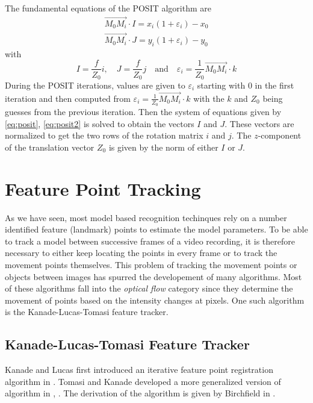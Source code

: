 \documentclass[11pt,a4paper]{report}
\begin{document}
The fundamental equations of the POSIT algorithm are
\begin{gather}\label{eq:posit}
\overrightarrow{M_0M_i}\cdot I  = x_i(1+\varepsilon_i) - x_0\\
\label{eq:posit2}
\overrightarrow{M_0M_i}\cdot J  = y_i(1+\varepsilon_i) - y_0
\end{gather}
with
\begin{equation*}
I = \frac{f}{Z_0}i \mathrm{, }\quad J = \frac{f}{Z_0}j \quad \mathrm{and} \quad
\varepsilon_i = \frac{1}{Z_0}\overrightarrow{M_0M_i} \cdot k
\end{equation*}
During the POSIT iterations, values are given to $\varepsilon_i$ starting with
0 in the first iteration and then computed from $\varepsilon_i =
\frac{1}{Z_0}\overrightarrow{M_0M_i} \cdot k$ with the $k$ and $Z_0$ being guesses from the
previous iteration. Then the system of equations given by \ref{eq:posit},
\ref{eq:posit2} is solved to obtain the vectors $I$ and $J$. These vectors are
normalized to get the two rows of the rotation matrix $i$ and $j$. The
$z$-component of the translation vector $Z_0$ is given by the norm of either $I$
or $J$.

\section{Feature Point Tracking}
As we have seen, most model based recognition techinques rely on a number identified feature
(landmark) points to estimate the model parameters. To be able to track a model
between successive frames of a video recording, it is therefore necessary to
either keep locating the points in every frame or to track the movement points
themselves. This problem of tracking the movement points or objects between
images has spurred the developement of many algorithms. Most of these algorithms
fall into the \textit{optical flow} category since they determine the movement
of points based on the intensity changes at pixels. One such algorithm is the
Kanade-Lucas-Tomasi feature tracker.
\subsection{Kanade-Lucas-Tomasi Feature Tracker}\label{s:kanade}
Kanade and Lucas first introduced an iterative feature point registration algorithm in
\cite{kanade}. Tomasi and Kanade developed a more generalized version of
algorithm in \cite{kanade2}, \cite{kanade3}. The derivation of the algorithm is
given by Birchfield in \cite{kanade4}.
\end{document}
